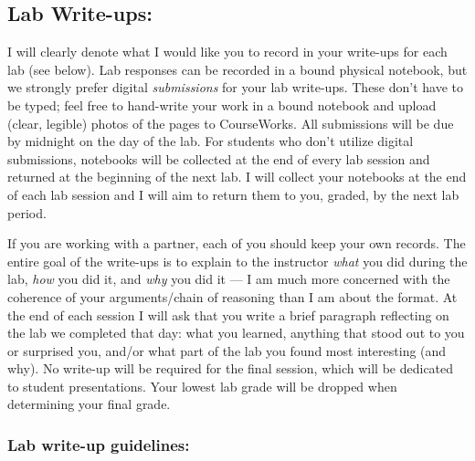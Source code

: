 \documentclass[11pt]{article}
\begin{document}
\subsection*{Lab Write-ups:}
\noindent I will clearly denote what I would like you to record in your write-ups for each lab (see below). Lab responses can be recorded in a bound physical notebook, but we strongly prefer digital \textit{submissions} for your lab write-ups. These don't have to be typed; feel free to hand-write your work in a bound notebook and upload (clear, legible) photos of the pages to CourseWorks.  All submissions will be due by midnight on the day of the lab. For students who don't utilize digital submissions, notebooks will be collected at the end of every lab session and returned at the beginning of the next lab. I will collect your notebooks at the end of each lab session and I will aim to return them to you, graded, by the next lab period. 

If you are working with a partner, each of you should keep your own records. The entire goal of the write-ups is to explain to the instructor \textit{what} you did during the lab, \textit{how} you did it, and \textit{why} you did it --- I am much more concerned with the coherence of your arguments/chain of reasoning than I am about the format. At the end of each session I will ask that you write a brief paragraph reflecting on the lab we completed that day: what you learned, anything that stood out to you or surprised you, and/or what part of the lab you found most interesting (and why). No write-up will be required for the final session, which will be dedicated to student presentations. Your lowest lab grade will be dropped when determining your final grade.

 
\subsubsection*{Lab write-up guidelines:}
 
\end{document}
